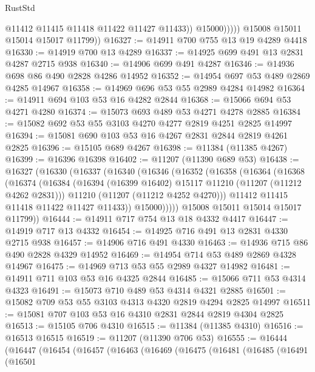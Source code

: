 \begin{lexlean}{RustStd}
\begin{coremodule}
                      @11412
                      @11415
                      @11418
                      @11422
                      @11427
                      @11433))
                  @15000)))))
        @15008
        @15011
        @15014
        @15017
        @11799))
@16327 := @14911 @700 @755 @13 @19 @4289 @4418
@16330 := @14919 @700 @13 @4289
@16337 := @14925 @699 @491 @13 @2831 @4287 @2715 @938
@16340 := @14906 @699 @491 @4287
@16346 := @14936 @698 @86 @490 @2828 @4286 @14952
@16352 := @14954 @697 @53 @489 @2869 @4285 @14967
@16358 := @14969 @696 @53 @55 @2989 @4284 @14982
@16364 := @14911 @694 @103 @53 @16 @4282 @2844
@16368 := @15066 @694 @53 @4271 @4280
@16374 := @15073 @693 @489 @53 @4271 @4278 @2885
@16384 := @15082 @692 @53 @55 @3103 @4270 @4277 @2819 @4251 @2825 @14997
@16394 := @15081 @690 @103 @53 @16 @4267 @2831 @2844 @2819 @4261 @2825
@16396 := @15105 @689 @4267
@16398 := @11384 (@11385 @4267)
@16399 := @16396 @16398
@16402 := @11207 (@11390 @689 @53)
@16438 := @16327
    (@16330
      (@16337
        (@16340
          (@16346
            (@16352
              (@16358
                (@16364
                  (@16368
                    (@16374
                      (@16384
                        (@16394 (@16399 @16402) @15117 @11210 (@11207 (@11212 @4262 @2831)))
                        @11210
                        (@11207 (@11212 @4252 @4270)))
                      @11412
                      @11415
                      @11418
                      @11422
                      @11427
                      @11433))
                  @15000)))))
        @15008
        @15011
        @15014
        @15017
        @11799))
@16444 := @14911 @717 @754 @13 @18 @4332 @4417
@16447 := @14919 @717 @13 @4332
@16454 := @14925 @716 @491 @13 @2831 @4330 @2715 @938
@16457 := @14906 @716 @491 @4330
@16463 := @14936 @715 @86 @490 @2828 @4329 @14952
@16469 := @14954 @714 @53 @489 @2869 @4328 @14967
@16475 := @14969 @713 @53 @55 @2989 @4327 @14982
@16481 := @14911 @711 @103 @53 @16 @4325 @2844
@16485 := @15066 @711 @53 @4314 @4323
@16491 := @15073 @710 @489 @53 @4314 @4321 @2885
@16501 := @15082 @709 @53 @55 @3103 @4313 @4320 @2819 @4294 @2825 @14997
@16511 := @15081 @707 @103 @53 @16 @4310 @2831 @2844 @2819 @4304 @2825
@16513 := @15105 @706 @4310
@16515 := @11384 (@11385 @4310)
@16516 := @16513 @16515
@16519 := @11207 (@11390 @706 @53)
@16555 := @16444
    (@16447
      (@16454
        (@16457
          (@16463
            (@16469
              (@16475
                (@16481
                  (@16485
                    (@16491
                      (@16501

\end{coremodule}
\end{lexlean}
